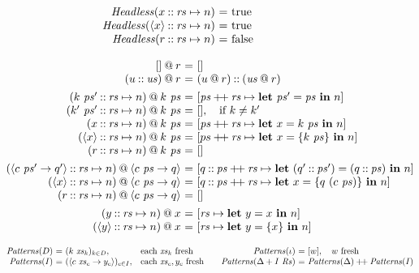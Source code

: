 \documentclass[12pt]{article}
\makeatletter
\newcommand\ba{\begin{array}}
\newcommand\ea{\end{array}}
\newenvironment{equations}{\[\ba{@{}r@{~}c@{~}l@{}}}{\ea\]\ignorespacesafterend}
\newenvironment{eqs}{\ba{@{}r@{~}c@{~}l@{}}}{\ea}
\newcommand{\key}[1]{\textbf{#1}} %
\newcommand{\handleSymbol}{\rightarrow}
\newcommand{\handle}[2]{{#1} \handleSymbol {#2}}
\newcommand{\thunk}[1]{\{{#1}\}}
\newcommand{\effin}[1]{\langle {#1} \rangle}
\newcommand{\id}{\iota}
\makeatother
\begin{document}
\begin{figure*}
\begin{equations}
  \hdless(x \cons \rs \mapsto n) &=& \true\\
  \hdless(\effin{x} \cons \rs \mapsto n) &=& \true\\
  \hdless(r \cons \rs \mapsto n) &=& \false\\
\end{equations}

\begin{equations}
   \emptylist \proj r &=& \emptylist \\
(u \cons \us) \proj r &=& (u \proj r) \cons (\us \proj r) \\[1ex]
(k~\ps' \cons \rs \mapsto n) \proj k~\ps &=&
        [\ps \concat \rs \mapsto \key{let}~\ps' = \ps~\key{in}~n] \\
(k'~\ps' \cons \rs \mapsto n) \proj k~\ps &=& [], \quad \text{if }k \neq k'\\
    (x \cons \rs \mapsto n) \proj k~\ps &=&
        [\ps \concat \rs \mapsto \key{let}~x = k~\ps~\key{in}~n] \\
(\effin{x} \cons \rs \mapsto n) \proj k~\ps &=& [ps \concat \rs \mapsto
          \key{let}~x = \thunk{k~\ps}~\key{in}~n]\\
     (r \cons \rs \mapsto n) \proj k~\ps &=& \emptylist \\[1ex]
%
%

(\effin{\handle{c~\ps'}{q'}} \cons \rs \mapsto n) \proj \effin{\handle{c~\ps}{q}} &=&
  [q \cons \ps \concat \rs \mapsto \key{let}~(q' \cons \ps') = (q \cons \ps)~\key{in}~n] \\
(\effin{x} \cons \rs \mapsto n) \proj \effin{\handle{c~\ps}{q}} &=&
  [q \cons \ps \concat \rs \mapsto \key{let}~x = \thunk{q~(c~\ps)}~\key{in}~n] \\
(r \cons \rs \mapsto n) \proj \effin{\handle{c~\ps}{q}} &=& \emptylist \\[1ex]
(y \cons \rs \mapsto n) \proj x &=& [\rs \mapsto \key{let}~y = x~\key{in}~n] \\
(\effin{y} \cons \rs \mapsto n) \proj x &=&
  [\rs \mapsto \key{let}~y = \thunk{x}~\key{in}~n] \\
\end{equations}

\[
\ba{@{}r@{~}c@{~}l@{\quad}l@{}}
\Patterns(D) &=& (k~\xs_k)_{k \in D},  &\text{each }\xs_k \text{ fresh} \\
\Patterns(I) &=& (\effin{\handle{c~\xs_c}{y_c}})_{c \in I}, &\text{each }\xs_c, y_c \text{ fresh} \\
\ea
\qquad
\begin{eqs}
\Patterns(\id) &=& [w], \quad w \text{ fresh} \\
\Patterns(\Delta + I~\Rs) &=& \Patterns(\Delta) \concat \Patterns(I) \\
\end{eqs}
\]


\end{figure*}
\end{document}

